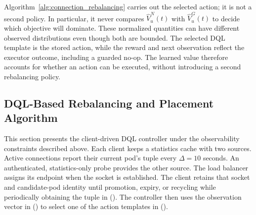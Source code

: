 Algorithm~\ref{alg:connection_rebalancing} carries out the selected action;
it is not a second policy. In particular, it never compares
$\widehat{V}^N_u(t)$ with $\widehat{V}^G_u(t)$ to decide which objective will
dominate. These normalized quantities can have different observed
distributions even though both are bounded. The selected DQL template is the
stored action, while the reward and next observation reflect the executor
outcome, including a guarded no-op. The learned value therefore accounts for whether an action can be executed,
without introducing a second rebalancing policy.


\subsection{DQL-Based Rebalancing and Placement Algorithm}
This section presents the client-driven DQL controller under the observability
constraints described above. Each client keeps a statistics cache with two sources.
Active connections report their current pod's tuple every $\Delta=10$ seconds.
An authenticated, statistics-only probe provides the other source. The load
balancer assigns its endpoint when the socket is established. The
client retains that socket and candidate-pod identity until promotion, expiry,
or recycling while periodically obtaining the tuple in (). The controller then
uses the observation vector in () to select one of the
action templates in ().


